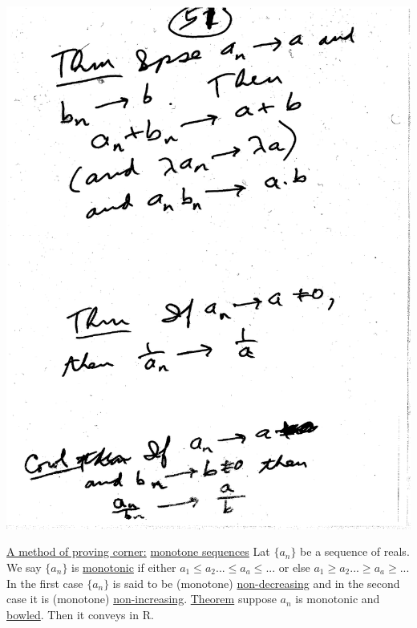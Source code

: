 \documentclass[10pt,a4paper]{article}
\begin{document}
{{\includegraphics[scale=.5]{Pages/SL_7} 

\newpage
\underline{A method of proving corner:}\newline
\underline{monotone sequences} \newline
Lat $\{a_n\}$ be a sequence of reals. We say $\{a_n\}$ is \underline{monotonic} if either $a_1 \leq a_2 ... \leq a_a \leq ...$
or else $a_1 \geq  a_2 ... \geq a_a \geq ...$ 
In the first case $\{a_n\}$ is said to be (monotone) \underline {non-decreasing} \textnormal and in the second case it is (monotone) \underline{non-increasing}. \underline{Theorem} suppose $a_n$ is monotonic and \underline{bowled}. Then it conveys in R.

}}
\end{document}
